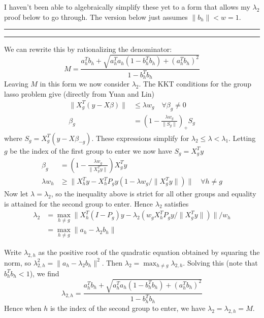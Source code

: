 \documentclass{imsart}
\newcommand{\norm}[1]{\lVert #1 \rVert}
\begin{document}
I haven't been able to algebraically simplify these yet to a form that allows my $\lambda_2$ proof below to go through. The version below just assumes $\norm{b_h} < w = 1$.

\hrule
\hrule
We can rewrite this by rationalizing the denominator:
\[
M =
\frac
{ a_h^T b_h +  \sqrt{ a_h^T a_h (1-b_h^Tb_h) + (a_h^T b_h)^2 }  }
{ 1-b_h^Tb_h }
\]
Leaving $M$ in this form we now consider $\lambda_2$. The KKT conditions for the group lasso problem give (directly from Yuan and Lin)
\begin{align*}
\norm{ X_g^T(y - X \beta) } & \leq \lambda w_g \quad \forall \beta_g \neq 0 \\
\beta_g & = \left( 1 - \frac{ \lambda w_g }{ \norm{S_g} } \right)_+ S_g
\end{align*}
where $S_g = X_g^T(y - X \beta_{-g})$. These expressions simplify for $\lambda_2 \leq \lambda < \lambda_1$. Letting $g$ be the index of the first group to enter we now have $S_g = X_g^Ty$ 
\begin{align*}
\beta_g & = \left( 1 - \frac{ \lambda w_g }{ \norm{X_g^Ty} } \right) X_g^Ty \\
\lambda w_h & \geq \norm{ X_h^Ty - X_h^T P_g y (1-\lambda w_g / \norm{X_g^Ty})  } \quad \forall h \neq g
\end{align*}
Now let $\lambda = \lambda_2$, so the inequality above is strict for all other groups and equality is attained for the second group to enter. Hence $\lambda_2$ satisfies
\begin{align*}
\lambda_2 & = \max_{h \neq g} 
\norm{ X_h^T(I - P_g) y - \lambda_2 ( w_g X_h^T P_g y / \norm{X_g^Ty} )  } / w_h\\
& = \max_{h \neq g} \norm{ a_h - \lambda_2 b_h } 
\end{align*}

Write $\lambda_{2,h}$ as the positive root of the quadratic equation obtained by squaring the norm, so $\lambda_{2,h}^2 = \norm{ a_h - \lambda_2 b_h }^2$. Then $\lambda_2 = \max_{h \neq g} \lambda_{2,h}$. Solving this (note that $b_h^Tb_h < 1$), we find
\[
\lambda_{2,h} = \frac
{ a_h^T b_h +  \sqrt{ a_h^T a_h (1-b_h^Tb_h) + (a_h^T b_h)^2 }  }
{ 1-b_h^Tb_h }
\]
Hence when $h$ is the index of the second group to enter, we have $\lambda_2 = \lambda_{2,h} = M$.



%

\end{document}
